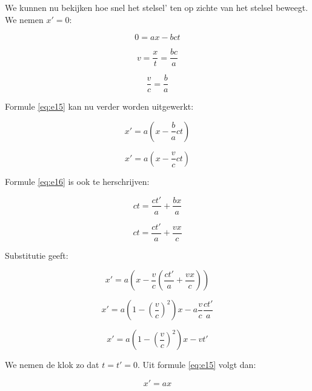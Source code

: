 We kunnen nu bekijken hoe snel het stelsel' ten op zichte van het
stelsel beweegt. We nemen $x'=0$:

\begin{equation}
0=ax-bct
\end{equation}


\begin{equation}
v=\frac{x}{t}=\frac{bc}{a}
\end{equation}


\begin{equation}
\frac{v}{c}=\frac{b}{a}\label{eq:e19}
\end{equation}


Formule \ref{eq:e15} kan nu verder worden uitgewerkt:

\begin{equation}
x'=a\left(x-\frac{b}{a}ct\right)
\end{equation}


\begin{equation}
x'=a\left(x-\frac{v}{c}ct\right)
\end{equation}


Formule \ref{eq:e16} is ook te herschrijven:

\begin{equation}
ct=\frac{ct'}{a}+\frac{bx}{a}
\end{equation}


\begin{equation}
ct=\frac{ct'}{a}+\frac{vx}{c}
\end{equation}


Substitutie geeft:

\begin{equation}
x'=a\left(x-\frac{v}{c}\left(\frac{ct'}{a}+\frac{vx}{c}\right)\right)
\end{equation}


\begin{equation}
x'=a\left(1-\left(\frac{v}{c}\right)^{2}\right)x-a\frac{v}{c}\frac{ct'}{a}
\end{equation}


\begin{equation}
x'=a\left(1-\left(\frac{v}{c}\right)^{2}\right)x-vt'\label{eq:e26}
\end{equation}


We nemen de klok zo dat $t=t'=0$. Uit formule \ref{eq:e15} volgt
dan:

\begin{equation}
x'=ax
\end{equation}


